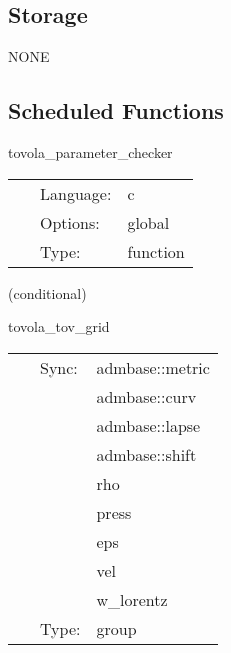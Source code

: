 \subsection*{Storage}NONE
\subsection*{Scheduled Functions}
\vspace{5mm}


\hspace{5mm} tovola\_parameter\_checker 

\hspace{5mm}{\it check if interpollation stencil does not exceed maximum value, and eos type is used appropriately. } 


\hspace{5mm}

 \begin{tabular*}{160mm}{cll} 
~ & Language:  & c \\ 
~ & Options:  & global \\ 
~ & Type:  & function \\ 
\end{tabular*} 


\vspace{5mm}

   (conditional) 

\hspace{5mm} tovola\_tov\_grid 

\hspace{5mm}{\it group for the tov initial data } 


\hspace{5mm}

 \begin{tabular*}{160mm}{cll} 
~ & Sync:  & admbase::metric \\ 
~& ~ &admbase::curv\\ 
~& ~ &admbase::lapse\\ 
~& ~ &admbase::shift\\ 
~& ~ &rho\\ 
~& ~ &press\\ 
~& ~ &eps\\ 
~& ~ &vel\\ 
~& ~ &w\_lorentz\\ 
~ & Type:  & group \\ 
\end{tabular*} 


